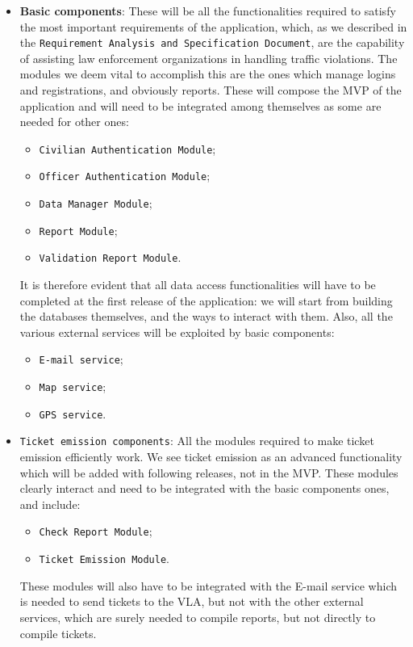 \documentclass[12pt,a4paper]{article}
\begin{document}
		\begin{itemize}
			\item \textbf{Basic components}:
			These will be all the functionalities required to satisfy the most important requirements of the application, which, as we described in the \texttt{Requirement Analysis and Specification Document}, are the capability of assisting law enforcement organizations in handling traffic violations. The modules we deem vital to accomplish this are the ones which manage logins and registrations, and obviously reports. These will compose the MVP of the application and will need to be integrated among themselves as some are needed for other ones:
\begin{itemize}
\item \texttt{Civilian Authentication Module};
\item \texttt{Officer Authentication Module}; 
\item \texttt{Data Manager Module};
\item \texttt{Report Module};
\item \texttt{Validation Report Module}.
\end{itemize}
It is therefore evident that all data access functionalities will have to be completed at the first release of the application: we will start from building the databases themselves, and the ways to interact with them. Also, all the various external services will be exploited by basic components:
\begin{itemize}
\item \texttt{E-mail service};
\item \texttt{Map service};
\item \texttt{GPS service}.
\end{itemize}
\item \texttt{Ticket emission components}: All the modules required to make ticket emission efficiently work. We see ticket emission as an advanced functionality which will be added with following releases, not in the MVP. These modules clearly interact and need to be integrated with the basic components ones, and include:
\begin{itemize}
\item \texttt{Check Report Module};
\item \texttt{Ticket Emission Module}.
\end{itemize}
These modules will also have to be integrated with the E-mail service which is needed to send tickets to the VLA, but not with the other external services, which are surely needed to compile reports, but not directly to compile tickets.

\end{itemize}
\end{document}
